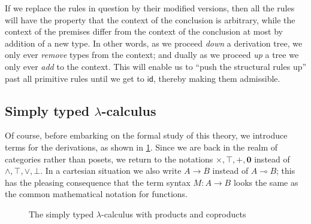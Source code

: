 \documentclass{book}
\def\idfunc{\mathsf{id}}
\let\types\vdash
\def\type{\;\ftype}
\let\meet\wedge
\let\join\vee
\def\unit{\top}%
\def\ttt{\mathord{\ast}}%
\def\timesE{\ensuremath{\mathord{\times}E}}
\def\timesI{\ensuremath{\mathord{\times}I}}
\def\pair#1#2{\langle #1,#2\rangle}
\def\pr#1#2#3{\pi_{#1}^{#2,#3}}
\def\plusE{\mathord{+}E}
\def\plusI{\mathord{+}I}
\def\inl{\mathsf{inl}}
\def\inr{\mathsf{inr}}
\def\acase#1#2{\mathsf{match}_{#1+#2}}
\def\match{\mathsf{match}}
\def\zero{\mathbf{0}}
\def\abort{\match_{\zero}}
\let\hom\multimap
\def\toI{\mathord{\to}I}
\def\toE{\mathord{\to}E}
\begin{document}
If we replace the rules in question by their modified versions, then all the rules will have the property that the context of the conclusion is arbitrary, while the context of the premises differ from the context of the conclusion at most by addition of a new type.
In other words, as we proceed \emph{down} a derivation tree, we only ever \emph{remove} types from the context; and dually as we proceed \emph{up} a tree we only ever \emph{add} to the context.
This will enable us to ``push the structural rules up'' past all primitive rules until we get to $\idfunc$, thereby making them admissible.

\subsection{Simply typed $\lambda$-calculus}
\label{subsec:stlc}

Of course, before embarking on the formal study of this theory, we introduce terms for the derivations, as shown in \cref{fig:stlc}.
Since we are back in the realm of categories rather than posets, we return to the notations $\times,\unit,+,\zero$ instead of $\meet,\top,\join,\bot$.
In a cartesian situation we also write $A\to B$ instead of $A\hom B$; this has the pleasing consequence that the term syntax $M:A\to B$ looks the same as the common mathematical notation for functions.

\begin{figure}
  \centering
  \caption{The simply typed $\lambda$-calculus with products and coproducts}
  \label{fig:stlc}
\end{figure}
\end{document}
